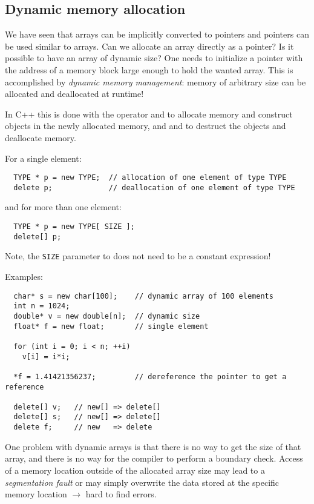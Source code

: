 \subsection{Dynamic memory allocation}
We have seen that arrays can be implicitly converted to pointers and pointers can be used similar to arrays. Can we allocate an array directly as
a pointer? Is it possible to have an array of dynamic size? One needs to initialize a pointer with the address of a memory block large enough to hold
the wanted array. This is accomplished by \emph{dynamic memory management}: memory of arbitrary size can be allocated and deallocated at runtime!

In C++ this is done with the operator  and  to allocate memory and construct objects in the newly allocated memory, and  and  to destruct the objects and deallocate memory.

For a single element:
\begin{verbatim}
  TYPE * p = new TYPE;  // allocation of one element of type TYPE
  delete p;             // deallocation of one element of type TYPE
\end{verbatim}
and for more than one element:
\begin{verbatim}
  TYPE * p = new TYPE[ SIZE ];
  delete[] p;
\end{verbatim}

Note, the \texttt{SIZE} parameter to  does not need to be a constant expression!

Examples:
\begin{verbatim}
  char* s = new char[100];    // dynamic array of 100 elements
  int n = 1024;
  double* v = new double[n];  // dynamic size
  float* f = new float;       // single element

  for (int i = 0; i < n; ++i)
    v[i] = i*i;

  *f = 1.41421356237;         // dereference the pointer to get a reference

  delete[] v;   // new[] => delete[]
  delete[] s;   // new[] => delete[]
  delete f;     // new   => delete
\end{verbatim}

One problem with dynamic arrays is that there is no way to get the size of that array, and there is no way for the compiler
to perform a boundary check. Access of a memory location outside of the allocated array size may lead to a \emph{segmentation fault} or
may simply overwrite the data stored at the specific memory location $\rightarrow$ hard to find errors.

